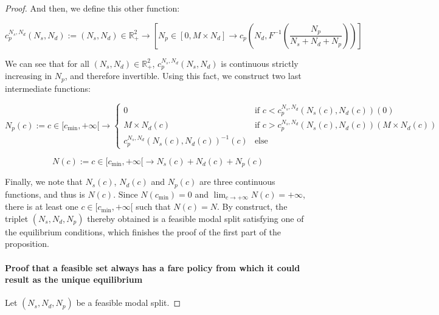 \documentclass[english, a4paper]{article}
\theoremstyle{plain}
\theoremstyle{definition}
\theoremstyle{remark}
\begin{document}
\begin{proof}
    And then, we define this other function:

    \begin{equation}
        c_p^{N_s, N_d}(N_s, N_d):= (N_s, N_d) \in \mathbb{R} _{+}^2 \longrightarrow \left[ N_p \in [0, M\times N_d] \longrightarrow c_p\left( N_d, F^{-1}\left(\frac{N_p}{N_s + N_d + N_p} \right) \right) \right]
    \end{equation}

    We can see that for all $(N_s, N_d) \in \mathbb{R} _{+}^2$, $c_p^{N_s, N_d}(N_s, N_d)$ is continuous strictly increasing in $N_p$, and therefore invertible. Using this fact, we construct two last intermediate functions:

    \begin{equation}
        N_p(c):= c\in [c_{\text{min}}, +\infty[ \longrightarrow
        \left\{
        \begin{array}{lr}
            0 & \text{if } c < c_p^{N_s, N_d} (N_s(c), N_d(c))(0)\\
            M\times N_d(c) & \text{if } c > c_p^{N_s, N_d} (N_s(c), N_d(c))(M\times N_d(c))\\
            c_p^{N_s, N_d} (N_s(c), N_d(c)) ^{-1} (c) & \text{else}
        \end{array}
        \right.
    \end{equation}

    \begin{equation}
        N(c):= c\in [c_{\text{min}}, +\infty[ \longrightarrow N_s(c) + N_d(c) + N_p(c)
    \end{equation}

    Finally, we note that $N_s(c)$, $N_d(c)$ and $N_p(c)$ are three continuous functions, and thus is $N(c)$. Since $N(c_{\text{min}}) = 0$ and $\lim_{c\rightarrow +\infty} N(c) = +\infty$, there is at least one $c\in [c_{\text{min}}, +\infty[$ such that $N(c) = N$. By construct, the triplet $(N_s, N_d, N_p)$ thereby obtained is a feasible modal split satisfying one of the equilibrium conditions, which finishes the proof of the first part of the proposition.


    \item \paragraph{Proof that a feasible set always has a fare policy from which it could result as the unique equilibrium}
    
    Let $(N_s, N_d, N_p)$ be a feasible modal split.


\end{proof}
\end{document}
